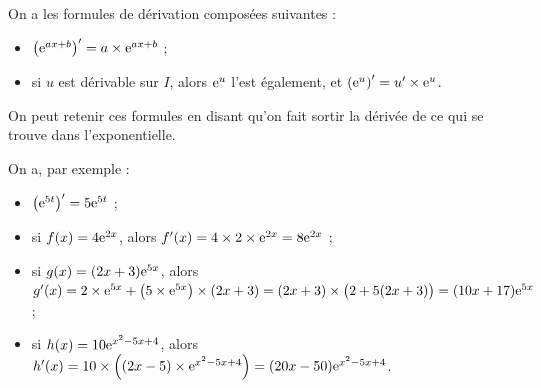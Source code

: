 \documentclass[a4paper,11pt]{article}
\begin{document}
\begin{cprop}
On a les formules de dérivation composées suivantes :
%
\begin{itemize}
	\item $\left({\rm e}^{ax+b}\right)^{\prime} = a \times {\rm e}^{ax+b}$ ;
	\item si $u$ est dérivable sur $I$, alors ${\rm e}^u$ l'est également, et $\left({\rm e}^u\right)^{\prime} = u' \times {\rm e}^u$.
\end{itemize}
\end{cprop}

\begin{crmq}
On peut retenir ces formules en disant qu'on fait \og sortir la dérivée \fg{} de ce qui se trouve dans l'exponentielle.
\end{crmq}

\begin{cexemple}[s]
On a, par exemple :
%
\begin{itemize}
	\item $\left({\rm e}^{5t}\right)^{\prime}=5{\rm e}^{5t}$ ;
	\item si $f(x)=4{\rm e}^{2x}$, alors $f'(x)=4 \times 2 \times {\rm e}^{2x}=8{\rm e}^{2x}$ ;
	\item si $g(x)=(2x+3){\rm e}^{5x}$, alors $g'(x)=2 \times {\rm e}^{5x} + \left(5 \times {\rm e}^{5x}\right) \times (2x+3) = (2x+3) \times \big(2 + 5(2x+3)\big) = (10x+17){\rm e}^{5x}$ ;
	\item si $h(x)=10 {\rm e}^{x^2-5x+4}$, alors $h'(x)=10 \times \left( (2x-5) \times {\rm e}^{x^2-5x+4}  \right) = (20x-50) {\rm e}^{x^2-5x+4}$.
\end{itemize}
\end{cexemple}
%
%
%
%
%
\end{document}
